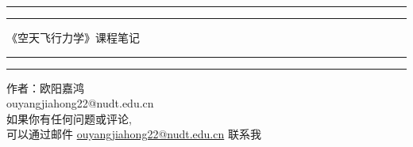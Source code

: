 \begin{titlepage}
	\centering %
	\scshape %
	\vspace*{1.5\baselineskip} %

	\rule{13cm}{1.6pt}\vspace*{-\baselineskip}\vspace*{2pt} %
	\rule{13cm}{0.4pt} %
	
		\vspace{0.75\baselineskip} %
	{	
        \Huge 
			《空天飞行力学》课程笔记 \\	
    }
		\vspace{0.75\baselineskip} %
	\rule{13cm}{0.4pt}\vspace*{-\baselineskip}\vspace{3.2pt} %
	\rule{13cm}{1.6pt} %
	
		\vspace{1.75\baselineskip} %
	{\large 作者：欧阳嘉鸿\\
		\vspace*{1.2\baselineskip}
	ouyangjiahong22@nudt.edu.cn} \\
	\vfill
如果你有任何问题或评论, \\ \vspace{1mm} 可以通过邮件 \url{ouyangjiahong22@nudt.edu.cn} 联系我\\ \vspace{1mm}

\end{titlepage}